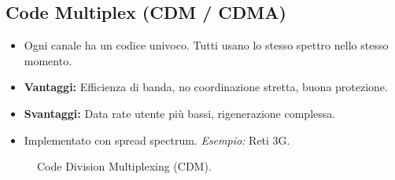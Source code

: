 \subsection{Code Multiplex (CDM / CDMA)}
\begin{itemize}
    \item Ogni canale ha un codice univoco. Tutti usano lo stesso spettro nello stesso momento.
    \item \textbf{Vantaggi:} Efficienza di banda, no coordinazione stretta, buona protezione.
    \item \textbf{Svantaggi:} Data rate utente più bassi, rigenerazione complessa.
    \item Implementato con spread spectrum. \textit{Esempio:} Reti 3G.
\end{itemize}
\begin{figure}[H]
    \centering
    \caption{Code Division Multiplexing (CDM).}
    \label{fig:cdm}
\end{figure}

